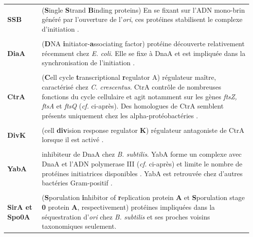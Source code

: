 \begin{longtable}{@{\hspace{-2cm}\hspace{1cm}} >{\bfseries}p{} | >{\small}p{}}
	\\[-0.2cm]
	 SSB & (\textbf{S}ingle \textbf{S}trand \textbf{B}inding proteins) En se fixant sur l'ADN mono-brin généré par l'ouverture de l'\textit{ori}, ces protéines stabilisent le complexe d'initiation \citep{o2013principles}.\\
	\\[-0.2cm]
	 DiaA & (\textbf{D}NA \textbf{i}nitiator-\textbf{a}ssociating factor) protéine découverte relativement récemment chez \textit{E. coli}. Elle se fixe à DnaA et est impliquée dans la synchronisation de l'initiation \citep{Katayama2010}. \\
	\\[-0.2cm]
	 CtrA & (\textbf{C}ell cycle \textbf{t}ranscriptional \textbf{r}egulator A) régulateur maître, caractérisé chez \textit{C. crescentus}. CtrA contrôle de nombreuses fonctions du cycle cellulaire et agit notamment sur les gènes \textit{ftsZ, ftsA} et \textit{ftsQ} (\textit{cf.} ci-après). Des homologues de CtrA semblent présents uniquement chez les alpha-protéobactéries \citep{Brilli2010,thanbichler2010}. \\
	\\[-0.2cm]
	 DivK & (cell \textbf{div}ision response regulator \textbf{K}) régulateur antagoniste de CtrA lorsque il est activé \citep{Brilli2010}.\\
	\\[-0.2cm]
	 YabA & inhibiteur de DnaA chez \textit{B. subtilis}. YabA forme un complexe avec DnaA et l'ADN polymerase III (\textit{cf.} ci-après) et limite le nombre de protéines initiatrices disponibles \citep{Katayama2010}. YabA est retrouvée chez d'autres bactéries Gram-positif \citep{Mott2007}.\\
	\\[-0.2cm]
	 SirA et Spo0A & (\textbf{S}porulation \textbf{i}nhibitor of \textbf{r}eplication protein \textbf{A} et \textbf{S}porulation stage  \textbf{0} protein \textbf{A}, respectivement) protéines impliquées dans la séquestration d'\textit{ori} chez \textit{B. subtilis} et ses proches voisins taxonomiques seulement.\\
	\end{longtable}
	
	
